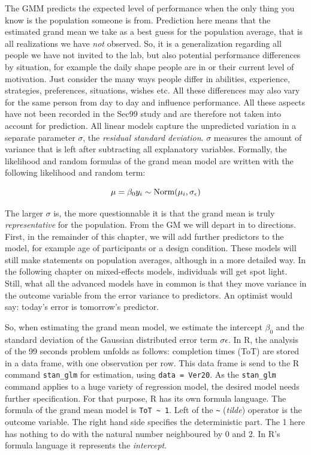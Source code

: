 \documentclass[]{svmono}
\theoremstyle{definition}
\theoremstyle{definition}
\theoremstyle{definition}
\theoremstyle{remark}
\begin{document}
The GMM predicts the expected level of performance when the only thing
you know is the population someone is from. Prediction here means that
the estimated grand mean we take as a best guess for the population
average, that is all realizations we have \emph{not} observed. So, it is
a generalization regarding all people we have not invited to the lab,
but also potential performance differences by situation, for example the
daily shape people are in or their current level of motivation. Just
consider the many ways people differ in abilities, experience,
strategies, preferences, situations, wishes etc. All these differences
may also vary for the same person from day to day and influence
performance. All these aspects have not been recorded in the Sec99 study
and are therefore not taken into account for prediction. All linear
models capture the unpredicted variation in a separate parameter
\(\sigma\), the \emph{residual standard deviation}. \(\sigma\) measures
the amount of variance that is left after subtracting all explanatory
variables. Formally, the likelihood and random formulas of the grand
mean model are written with the following likelihood and random term:

\[
\mu = \beta_0\\
y_i \sim \textrm{Norm}(\mu_i, \sigma_\epsilon)
\]

The larger \(\sigma\) is, the more questionnable it is that the grand
mean is truly \emph{representative} for the population. From the GM we
will depart in to directions. First, in the remainder of this chapter,
we will add further predictors to the model, for example age of
participants or a design condition. These models will still make
statements on population averages, although in a more detailed way. In
the following chapter on mixed-effects models, individuals will get spot
light. Still, what all the advanced models have in common is that they
move variance in the outcome variable from the error variance to
predictors. An optimist would say: today's error is tomorrow's
predictor.

So, when estimating the grand mean model, we estimate the intercept
\(\beta_0\) and the standard deviation of the Gaussian distributed error
term \(\sigma\epsilon\). In R, the analysis of the 99 seconds problem
unfolds as follows: completion times (ToT) are stored in a data frame,
with one observation per row. This data frame is send to the R command
\texttt{stan\_glm} for estimation, using \texttt{data\ =\ Ver20}. As the
\texttt{stan\_glm} command applies to a huge variety of regression
model, the desired model needs further specification. For that purpose,
R has its own formula language. The formula of the grand mean model is
\texttt{ToT\ \textasciitilde{}\ 1}. Left of the
\texttt{\textasciitilde{}} (\emph{tilde}) operator is the outcome
variable. The right hand side specifies the deterministic part. The 1
here has nothing to do with the natural number neighboured by 0 and 2.
In R's formula language it represents the \emph{intercept}.
\end{document}
